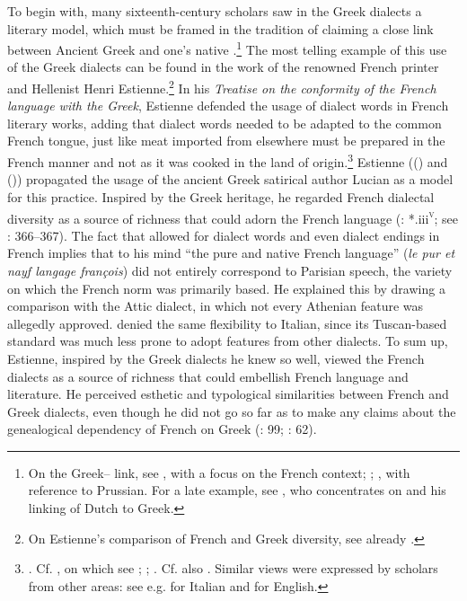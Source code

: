 To begin with, many sixteenth-century scholars saw in the Greek dialects a literary model, which must be framed in the tradition of claiming a close link between Ancient Greek and one’s native .\footnote{On the Greek– link, see \citet{Demaiziere1982}, with a focus on the French context; \citet{Trapp1990}; \citet{Dini2004}, with reference to Prussian. For a late example, see \citet[435--436]{VanHal2016}, who concentrates on \citet[119--132]{Reitz1730} and his linking of Dutch to Greek.} The most telling example of this use of the Greek dialects can be found in the work of the renowned French printer and Hellenist Henri Estienne.\footnote{On Estienne’s comparison of French and Greek diversity, see already \citet[70]{Demaiziere1988}.} In his \textit{Treatise on the conformity of the French language with the Greek}, Estienne defended the usage of dialect words in French literary works, adding that dialect words needed to be adapted to the common French tongue, just like meat imported from elsewhere must be prepared in the French manner and not as it was cooked in the land of origin.\footnote{\citet[¶¶.ii\textsc{\textsuperscript{v}}]{Estienne1565}. Cf. \citet[\texttt{\char"2720}\textsc{\textsuperscript{r}}]{Ronsard1550}, on which see \citet[170]{Alinei1984}; \citet[24]{Barbier-mueller1990}; \citet[14]{Trapp1990}. Cf. also \citet[456, 458]{Mambrun1661}. Similar views were expressed by scholars from other areas: see e.g. \citet[\textsc{e.}iii\textsc{\textsuperscript{v}}–\textsc{e.}iv\textsc{\textsuperscript{r}}]{Oreadini1525} for Italian and \citet[\textsc{a}.vi\textsc{\textsuperscript{r}}]{Craige1606} for English.} Estienne ((\citeyear[133]{Estienne1579}) and (\citeyear[*.iii\textsc{\textsuperscript{v}}–*.iiii\textsc{\textsuperscript{r}}]{Estienne1582})) propagated the usage of the ancient Greek satirical author Lucian as a model for this practice. Inspired by the Greek heritage, he regarded French dialectal diversity as a source of richness that could adorn the French language (\citealt{Estienne1582}: *.iii\textsc{\textsuperscript{v}}; see \citealt{Auroux1992}: 366–367). The fact that \citet[143]{Estienne1579} allowed for dialect words and even dialect endings in French implies that to his mind “the pure and native French language” (\textit{le pur et nayf langage françois}) did not entirely correspond to Parisian speech, the variety on which the French norm was primarily based. He explained this by drawing a comparison with the Attic dialect, in which not every Athenian feature was allegedly approved. \citet[133--134]{Estienne1579} denied the same flexibility to Italian, since its Tuscan-based standard was much less prone to adopt features from other dialects. To sum up, Estienne, inspired by the Greek dialects he knew so well, viewed the French dialects as a source of richness that could embellish French language and literature. He perceived esthetic and typological similarities between French and Greek dialects, even though he did not go so far as to make any claims about the genealogical dependency of French on Greek (\citealt{Droixhe1978}: 99; \citealt{Considine2008a}: 62).

